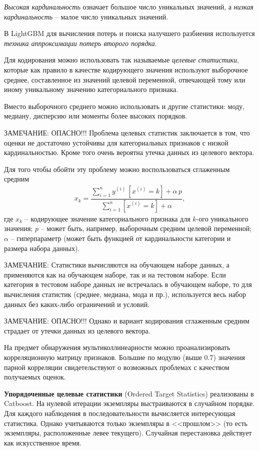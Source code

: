 \documentclass[%
	11pt,
	a4paper,
	utf8,
		]{article}
\begin{document}
\emph{Высокая кардинальность} означает большое число уникальных значений, а \emph{низкая кардинальность} -- малое число уникальных значений.

В LightGBM для вычисления потерь и поиска налучшего разбиения используется \emph{техника аппроксимации потерь второго порядка}.

Для кодирования можно использовать так называемые \emph{целевые статистики}, которые как правило в качестве кодирующего значения используют выборочное среднее, составленное из значений целевой переменной, отвечающей тому или иному уникальному значению категориального признака.

Вместо выборочного среднего можно использовать и другие статистики: моду, медиану, дисперсию или моменты более высоких порядков. 

ЗАМЕЧАНИЕ: ОПАСНО!!! Проблема целевых статистик заключается в том, что оценки не достаточно устойчивы для категориальных признаков с низкой кардинальностью. Кроме того очень вероятна утечка данных из целевого вектора.

Для того чтобы обойти эту проблему можно воспользоваться сглаженным средним
\begin{align*}
  x_k = \dfrac{ \sum\limits_{i=1}^n y^{(i)} \, [x^{(i)} = k] + \alpha \, p }{\sum\limits_{i=1}^n [x^{(i)} = k] + \alpha} ,
\end{align*}
где $ x_k $ -- кодирующее значение категориального признака для $ k $-ого уникального значения; $ p $ -- может быть, например, выборочным средним целевой переменной; $ \alpha $ -- гиперпараметр (может быть функцией от кардинальности категории и размера набора данных).

ЗАМЕЧАНИЕ: Статистики вычисляются на обучающем наборе данных, а применяются как на обучающем наборе, так и на тестовом наборе. Если категория в тестовом наборе данных не встречалась в обучающем наборе, то для вычисления статистик (среднее, медиана, мода и пр.), используется весь набор данных без каких-либо ограничений и условий.

ЗАМЕЧАНИЕ: ОПАСНО!!! Однако и вариант кодирования сглаженным средним страдает от утечки данных из целевого вектора.

На предмет обнаружения мультиколлинеарности можно проанализировать корреляционную матрицу признаков. Большие по модулю (выше 0.7) значения парной корреляции свидетельствуют о возможных проблемах с качеством получаемых оценок. 

\textbf{Упорядоченные целевые статистики} (Ordered Target Statistics) реализованы в Catboost. На нулевой итерации экземпляры выстраиваются в случайном порядке. Для каждого наблюдения в последовательности вычисляется интересующая статистика. Однако учитываются только экземпляры в <<прошлом>> (то есть экземпляры, расположенные левее текущего). Случайная перестановка действует как искусственное время.
\end{document}
